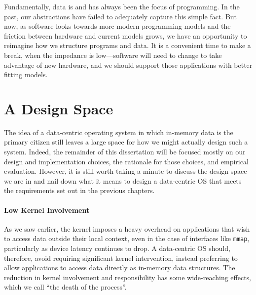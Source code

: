 
Fundamentally, data is and has always been the focus of programming. In the past, our abstractions have failed to
adequately capture this simple fact. But now, as software looks towards more modern programming models and the friction
between hardware and current models grows, we have an opportunity to reimagine how we structure programs and data.
It is a convenient time to make a break, when the impedance is low---software will need to change to take advantage of
new hardware, and we should support those applications with better fitting models.





\section{A Design Space}

The idea of a data-centric operating system in which in-memory data is the primary citizen still leaves a large space for how
we might actually design such a system. Indeed, the remainder of this dissertation will be focused mostly on our design and
implementation choices, the rationale for those choices, and empirical evaluation. However, it is still worth taking a
minute to discuss the design space we are in and nail down what it means to design a data-centric OS that meets the
requirements set out in the previous chapters.

\paragraph{Low Kernel Involvement} As we saw earlier, the kernel imposes a heavy overhead on applications that wish to
access data outside their local context, even in the case of interfaces like \texttt{mmap}, particularly as device
latency continues to drop. A data-centric OS should, therefore, avoid requiring significant kernel intervention, instead
preferring to allow applications to access data directly as in-memory data structures. The reduction in
kernel involvement and responsibility has some wide-reaching effects, which we call ``the death of the process''.

